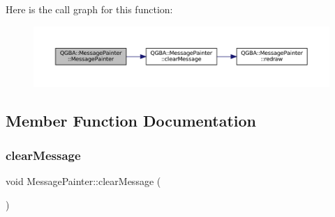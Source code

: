 Here is the call graph for this function\+:
\nopagebreak
\begin{figure}[H]
\begin{center}
\leavevmode
\includegraphics[width=350pt]{class_q_g_b_a_1_1_message_painter_a17d9cc1af0b1c6ffe65f0ff91d15a39b_cgraph}
\end{center}
\end{figure}


\subsection{Member Function Documentation}
\mbox{\label{class_q_g_b_a_1_1_message_painter_a6880cc16df94e00ff0d57869f93022b0}} 
\subsubsection{\texorpdfstring{clear\+Message}{clearMessage}}
{\footnotesize\ttfamily void Message\+Painter\+::clear\+Message (\begin{DoxyParamCaption}{ }\end{DoxyParamCaption})\hspace{0.3cm}{\ttfamily [slot]}}

